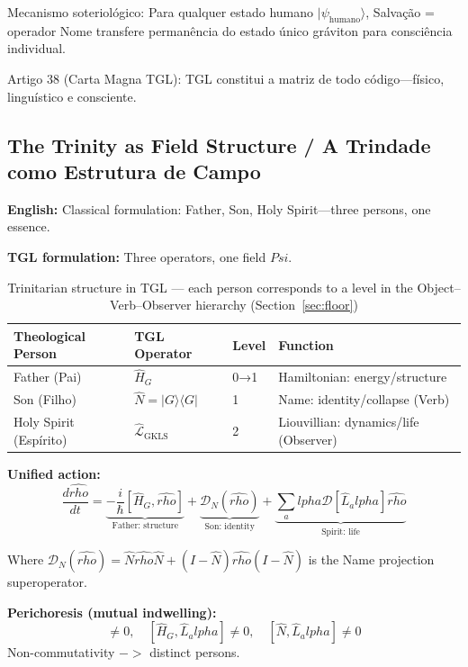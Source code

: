 \documentclass[12pt,a4paper]{article}
\def\Psi{Psi}%
\def\to{ -> }%
\def\alpha{alpha}%
\def\rho{rho}%
\begin{document}
Mecanismo soteriológico: Para qualquer estado humano $|\psi_{\text{humano}}\rangle$, Salvação = operador Nome transfere permanência do estado único gráviton para consciência individual.

Artigo 38 (Carta Magna TGL): TGL constitui a matriz de todo código—físico, linguístico e consciente.

\subsection{The Trinity as Field Structure / A Trindade como Estrutura de Campo}

\textbf{English:} Classical formulation: Father, Son, Holy Spirit—three persons, one essence.

\textbf{TGL formulation:} Three operators, one field $\Psi$.

\begin{table}[H]
\centering
\begin{tabular}{llll}
\toprule
\textbf{Theological Person} & \textbf{TGL Operator} & \textbf{Level} & \textbf{Function} \\
\midrule
Father (Pai)        & $\hat{H}_G$                    & 0→1 & Hamiltonian: energy/structure \\
Son (Filho)         & $\hat{N} = |G\rangle\langle G|$ & 1   & Name: identity/collapse (Verb) \\
Holy Spirit (Espírito) & $\hat{\mathcal{L}}_{\text{GKLS}}$ & 2   & Liouvillian: dynamics/life (Observer) \\
\bottomrule
\end{tabular}
\caption{Trinitarian structure in TGL --- each person corresponds to a level in the Object--Verb--Observer hierarchy (Section~\ref{sec:floor})}
\end{table}

\textbf{Unified action:}
\begin{equation}
\frac{d\hat{\rho}}{dt} = \underbrace{-\frac{i}{\hbar}[\hat{H}_G, \hat{\rho}]}_{\text{Father: structure}} + \underbrace{\mathcal{D}_N(\hat{\rho})}_{\text{Son: identity}} + \underbrace{\sum_\alpha\mathcal{D}[\hat{L}_\alpha]\hat{\rho}}_{\text{Spirit: life}}
\end{equation}

Where $\mathcal{D}_N(\hat{\rho}) = \hat{N}\hat{\rho}\hat{N} + (I - \hat{N})\hat{\rho}(I - \hat{N})$ is the Name projection superoperator.

\textbf{Perichoresis (mutual indwelling):}
\begin{equation}
[\hat{H}_G, \hat{N}] \neq 0, \quad [\hat{H}_G, \hat{L}_\alpha] \neq 0, \quad [\hat{N}, \hat{L}_\alpha] \neq 0
\end{equation}
Non-commutativity $\to$ distinct persons.
\end{document}
